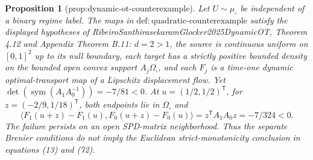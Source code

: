 \documentclass{article}
\newtheorem{proposition}{Proposition}
\begin{document}
\begin{proposition}[prop:dynamic-ot-counterexample]\label{prop:dynamic-ot-counterexample}
Let \(U\sim\mu_{\square}\) be independent of a binary regime label. The maps in \(\mathrm{def:quadratic\text{-}counterexample}\) satisfy the displayed hypotheses of RibeiroSanthirasekaramGlocker2025DynamicOT, Theorem 4.12 and Appendix Theorem B.11: \(d=2>1\), the source is continuous uniform on \([0,1]^2\) up to its null boundary, each target has a strictly positive bounded density on the bounded open convex support \(A_j\Omega_{\square}\), and each \(F_j\) is a time-one dynamic optimal-transport map of a Lipschitz displacement flow. Yet \(\det(\operatorname{sym}(A_1A_0^{-1}))=-7/81<0\). At \(u=(1/2,1/2)^{\mathsf T}\), for \(z=(-2/9,1/18)^{\mathsf T}\), both endpoints lie in \(\Omega_{\square}\) and \[\langle F_1(u+z)-F_1(u),F_0(u+z)-F_0(u)\rangle=z^{\mathsf T}A_1A_0z=-7/324<0.\] The failure persists on an open SPD-matrix neighborhood. Thus the separate Brenier conditions do not imply the Euclidean strict-monotonicity conclusion in equations (13) and (72).
\end{proposition}
\end{document}
